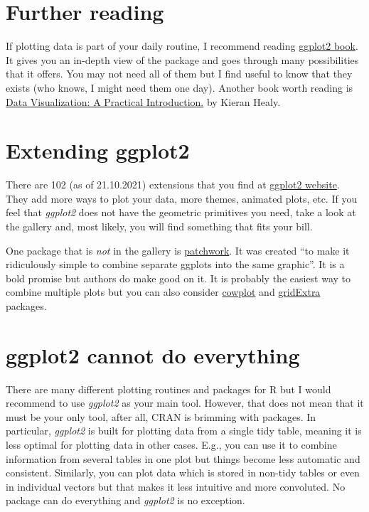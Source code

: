 \documentclass[
]{book}
\begin{document}
\hypertarget{further-reading}{%
\section{Further reading}\label{further-reading}}

If plotting data is part of your daily routine, I recommend reading \href{https://ggplot2-book.org/}{ggplot2 book}. It gives you an in-depth view of the package and goes through many possibilities that it offers. You may not need all of them but I find useful to know that they exists (who knows, I might need them one day). Another book worth reading is \href{https://kieranhealy.org/publications/dataviz/}{Data Visualization: A Practical Introduction.} by Kieran Healy.

\hypertarget{extending-ggplot2}{%
\section{Extending ggplot2}\label{extending-ggplot2}}

There are 102 (as of 21.10.2021) extensions that you find at \href{https://exts.ggplot2.tidyverse.org/gallery/}{ggplot2 website}. They add more ways to plot your data, more themes, animated plots, etc. If you feel that \emph{ggplot2} does not have the geometric primitives you need, take a look at the gallery and, most likely, you will find something that fits your bill.

One package that is \emph{not} in the gallery is \href{https://patchwork.data-imaginist.com/}{patchwork}. It was created ``to make it ridiculously simple to combine separate ggplots into the same graphic''. It is a bold promise but authors do make good on it. It is probably the easiest way to combine multiple plots but you can also consider \href{https://github.com/wilkelab/cowplot}{cowplot} and \href{https://cran.r-project.org/web/packages/gridExtra/index.html}{gridExtra} packages.

\hypertarget{ggplot2-cannot-do-everything}{%
\section{ggplot2 cannot do everything}\label{ggplot2-cannot-do-everything}}

There are many different plotting routines and packages for R but I would recommend to use \emph{ggplot2} as your main tool. However, that does not mean that it must be your only tool, after all, CRAN is brimming with packages. In particular, \emph{ggplot2} is built for plotting data from a single tidy table, meaning it is less optimal for plotting data in other cases. E.g., you can use it to combine information from several tables in one plot but things become less automatic and consistent. Similarly, you can plot data which is stored in non-tidy tables or even in individual vectors but that makes it less intuitive and more convoluted. No package can do everything and \emph{ggplot2} is no exception.
\end{document}
